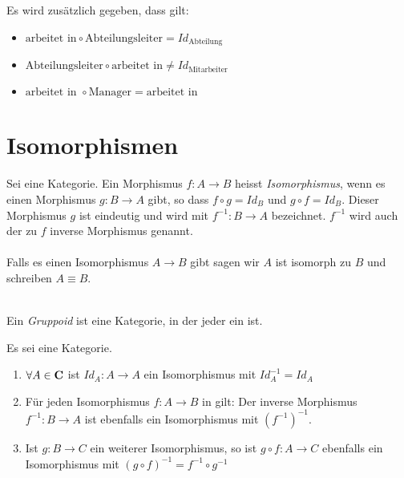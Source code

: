 \documentclass{article}
\renewcommand{\id}{\ensuremath{Id}}
\begin{document}
	 \begin{bsp}[Datenbanken]

		  \cite[Beispiel 2.2.33]{Bra} \\
		  \\
		 Es wird zus\"atzlich gegeben, dass gilt:

		 \begin{itemize}
			 \item \( \text{arbeitet \ in} \circ \text{Abteilungsleiter}= \id_\text{Abteilung}  \)
			 \item \( \text{Abteilungsleiter} \circ \text{arbeitet \ in} \neq \id_\text{Mitarbeiter}  \)
			 \item \( \text{arbeitet \ in }  \circ \text{Manager} = \text{arbeitet \ in } \)
		 \end{itemize}
	 \end{bsp}
	\newpage
	\section{Isomorphismen}
		
		\begin{defi}[Isomorphismus]
		 \cite[Definition 2.3.1]{Bra}
		Sei \CatC eine Kategorie. Ein Morphismus \( f: A \to B  \) heisst  \emph{Isomorphismus}, wenn es einen Morphismus \( g: B \to A \) gibt, so dass \( f \circ g  = \id_B \) und \( g \circ f = \id_B \). 
		Dieser Morphismus \( g \) ist eindeutig und wird mit \( f^{-1} :B \to A \) bezeichnet.
		\(f^{-1} \) wird auch der zu \( f \)  inverse Morphismus genannt.\\

		 \\

		Falls es einen Isomorphismus \( A \to B \) gibt sagen wir \( A \) ist isomorph zu \( B \) und schreiben \( A \equiv B \).
		\end{defi}
		
		\begin{defi}[Gruppoid]
		  \cite[Beispiel 2.2.34]{Bra} \\
		 Ein \emph{Gruppoid} ist eine Kategorie, in der jeder \Mor ein \Iso ist.
		\end{defi}
		  
		\begin{lem}
		   \cite[Lemma 2.3.9]{Bra}
		  Es sei \CatC eine Kategorie.
		\begin{enumerate}
			  \item \( \forall A \in \mathbf{C} \) ist \( \id_A :A \to A  \) ein Isomorphismus mit \( \id_A^{-1}=\id_A \)
			  \item F\"ur jeden Isomorphismus \( f: A \to B \) in \CatC gilt: Der inverse Morphismus \(f^{-1}: B \to A \) ist ebenfalls ein Isomorphismus mit \( \left( f^{-1} \right)^{-1} \).
			  \item Ist \(g: B \to C \) ein weiterer Isomorphismus, so ist \( g \circ f :A \to C \) ebenfalls ein Isomorphismus mit \( \left( g \circ f \right)^{-1} =f^{-1} \circ g^{-1} \)  
		  \end{enumerate}
		  	\end{lem}
		  	
\end{document}
